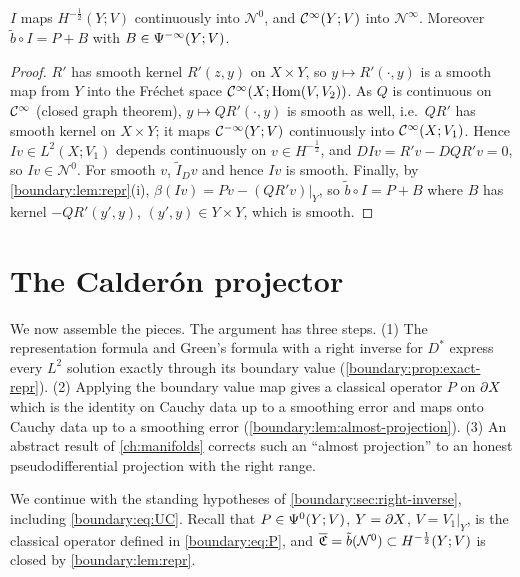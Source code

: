 \begin{lemma}\label{boundary:lem:solutions}
$I$ maps $H^{-\frac12}(Y;V)$ continuously into $\mathcal{N}^0$, and $\mathcal{C}^\infty(Y;V)$ into
$\mathcal{N}^\infty$. Moreover $\tilde b\circ I=P+B$ with $B\in\Psi^{-\infty}(Y;V)$.
\end{lemma}
\begin{proof}
$R'$ has smooth kernel $R'(z,y)$ on $X\times Y$, so $y\mapsto R'(\cdot,y)$ is a smooth
map from $Y$ into the Fr\'echet space $\mathcal{C}^\infty(X;\operatorname{Hom}(V,V_2))$. As $Q$ is continuous on
$\mathcal{C}^\infty$ (closed graph theorem), $y\mapsto QR'(\cdot,y)$ is smooth as well, i.e.\ $QR'$
has smooth kernel on $X\times Y$; it maps $\mathcal{C}^{-\infty}(Y;V)$ continuously into $\mathcal{C}^\infty(X;V_1)$.
Hence $Iv\in L^2(X;V_1)$ depends continuously on $v\in H^{-\frac12}$, and $DIv=R'v-
DQR'v=0$, so $Iv\in\mathcal{N}^0$. For smooth $v$, $\tilde I_Dv$ and hence $Iv$ is
smooth. Finally, by \cref{boundary:lem:repr}(i), $\beta(Iv)=Pv-(QR'v)|_Y$, so $\tilde
b\circ I=P+B$ where $B$ has kernel $-QR'(y',y)$, $(y',y)\in Y\times Y$, which is smooth.
\end{proof}

\section{The Calder\'on projector}\label{boundary:sec:calderon}

We now assemble the pieces. The argument has three steps. (1) The representation
formula and Green's formula with a right inverse for $D^*$ express every $L^2$
solution exactly through its boundary value
(\cref{boundary:prop:exact-repr}). (2) Applying the boundary value map gives a
classical operator $P$ on $\partial X$ which is the identity on Cauchy data up to a
smoothing error and maps onto Cauchy data up to a smoothing error
(\cref{boundary:lem:almost-projection}). (3) An abstract result of
\cref{ch:manifolds} corrects such an ``almost projection'' to an honest
pseudodifferential projection with the right range.

We continue with the standing hypotheses of \cref{boundary:sec:right-inverse},
including \eqref{boundary:eq:UC}. Recall that $P\in\Psi^{0}(Y;V)$, $Y=\partial X$,
$V=V_1|_Y$, is the classical operator defined in \eqref{boundary:eq:P}, and
$\overline{\mathfrak{C}}=\tilde b(\mathcal{N}^0)\subset H^{-\frac12}(Y;V)$ is closed by
\cref{boundary:lem:repr}.

